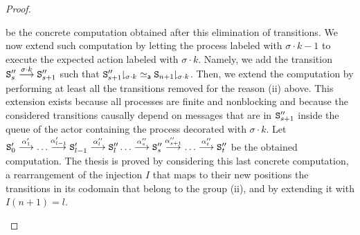 \documentclass{LMCS}
\theoremstyle{plain}\newtheorem{proposition}[thm]{Proposition}
\theoremstyle{plain}\newtheorem{lemma}[thm]{Lemma}
\theoremstyle{plain}\newtheorem{theorem}[thm]{Theorem}
\theoremstyle{plain}\newtheorem{corollary}[thm]{Corollary}
\newcommand{\State}{{\tt S}}
\newcommand{\lred}[1]{\stackrel{#1}{\longrightarrow}}
\newcommand{\proj}[2]{{#1\!\!\downharpoonright_{#2}}}
\begin{document}
\begin{proof}
\begin{itemize}
be the concrete computation obtained after this elimination of transitions.
We now extend such computation 
by letting the process labeled with $\sigma\cdot k-1$
to execute the expected action labeled with $\sigma\cdot k$.
Namely, we add
the transition $\State''_s \lred{\sigma\cdot k} \State''_{s+1}$
such that $\proj{\State''_{s+1}}{\sigma\cdot k} \simeq_{\mathsf a} \proj{\State_{n+1}}{\sigma\cdot k}$.
Then, we extend the computation by performing at least
all the transitions removed for the reason (ii) above.
This extension exists because all processes are finite and
nonblocking and because the considered transitions causally depend on
messages that are in $\State''_{s+1}$ inside the queue of the actor
containing the process decorated with $\sigma\cdot k$.
Let
$\State'_0 \lred{\alpha'_1} \ldots \lred{\alpha'_{l-1}}
\State'_{l-1}  \lred{\alpha''_l} \State''_l \ldots \lred{\alpha''_s} \State''_s
\lred{\alpha''_{s+1}}\ldots \lred{\alpha''_{t}}\State''_t$
be the obtained computation.
The thesis is proved by considering this last concrete
computation, a rearrangement of the injection $I$
that maps to their new positions the transitions in its codomain
that belong to the group (ii), and by extending it with $I(n+1)=l$.\qedhere
\end{itemize}
\end{proof}
\end{document}
